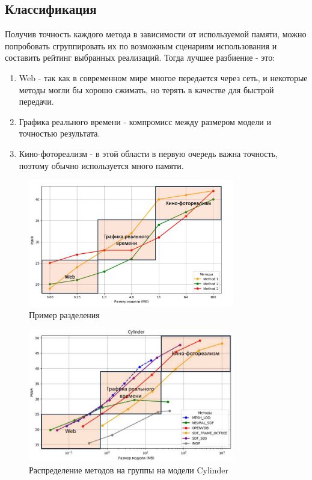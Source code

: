 \documentclass[a4paper,hidelinks,12pt]{article}
\begin{document}
\subsection{Классификация}

Получив точность каждого метода в зависимости от используемой памяти, можно попробовать сгруппировать их по возможным сценариям 
использования и составить рейтинг выбранных реализаций. Тогда лучшее разбиение - это:
\begin{enumerate}
	\item Web - так как в современном мире многое передается через сеть, и некоторые методы могли бы хорошо сжимать, но терять в качестве для быстрой передачи.
	\item Графика реального времени - компромисс между размером модели и точностью результата.
	\item Кино-фотореализм - в этой области в первую очередь важна точность, поэтому обычно используется много памяти.
\end{enumerate}

\begin{figure}[ht]
  \centering
  \includegraphics[width=0.8\textwidth]{example2.jpeg}
  \caption{Пример разделения}
  \label{fig:example}
\end{figure}

\begin{figure}[ht]
  \centering
  \includegraphics[width=0.8\textwidth]{cylinder.png}
  \caption{Распределение методов на группы на модели Cylinder}
  \label{fig:example}
\end{figure}
\end{document}

